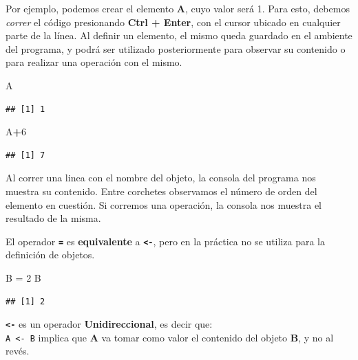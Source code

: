 \documentclass[]{book}
\newenvironment{Shaded}{\begin{snugshade}}{\end{snugshade}}
\newcommand{\DecValTok}[1]{\textcolor[rgb]{0.00,0.00,0.81}{#1}}
\newcommand{\NormalTok}[1]{#1}
\newcommand{\OperatorTok}[1]{\textcolor[rgb]{0.81,0.36,0.00}{\textbf{#1}}}
\newcommand{\StringTok}[1]{\textcolor[rgb]{0.31,0.60,0.02}{#1}}
\begin{document}
Por ejemplo, podemos crear el elemento \textbf{A}, cuyo valor será 1. Para esto, debemos \emph{correr} el código presionando \textbf{Ctrl + Enter}, con el cursor ubicado en cualquier parte de la línea. Al definir un elemento, el mismo queda guardado en el ambiente del programa, y podrá ser utilizado posteriormente para observar su contenido o para realizar una operación con el mismo.

\begin{Shaded}
\begin{Highlighting}[]
\NormalTok{A }
\end{Highlighting}
\end{Shaded}

\begin{verbatim}
## [1] 1
\end{verbatim}

\begin{Shaded}
\begin{Highlighting}[]
\NormalTok{A}\OperatorTok{+}\DecValTok{6}
\end{Highlighting}
\end{Shaded}

\begin{verbatim}
## [1] 7
\end{verbatim}

Al correr una linea con el nombre del objeto, la consola del programa nos muestra su contenido. Entre corchetes observamos el número de orden del elemento en cuestión. Si corremos una operación, la consola nos muestra el resultado de la misma.

El operador \textbf{\texttt{=}} es \textbf{equivalente} a \textbf{\texttt{\textless{}-}}, pero en la práctica no se utiliza para la definición de objetos.

\begin{Shaded}
\begin{Highlighting}[]
\NormalTok{B =}\StringTok{ }\DecValTok{2}
\NormalTok{B}
\end{Highlighting}
\end{Shaded}

\begin{verbatim}
## [1] 2
\end{verbatim}

\textbf{\texttt{\textless{}-}} es un operador \textbf{Unidireccional}, es decir que:\\
\texttt{A\ \textless{}-\ B} implica que \textbf{A} va tomar como valor el contenido del objeto \textbf{B}, y no al revés.
\end{document}
